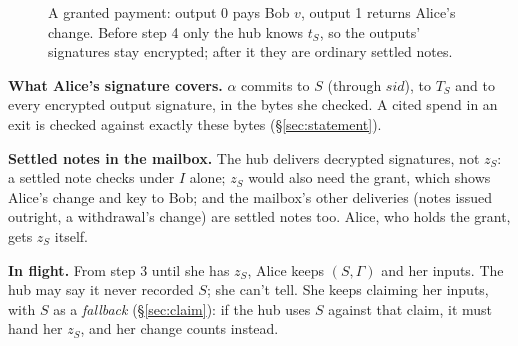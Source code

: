 \documentclass[11pt]{article}
\theoremstyle{plain}
\theoremstyle{definition}
\newcommand{\sid}{\mathit{sid}}
\newcommand{\BVfy}{\mathsf{BVerify}}
\newcommand{\Dec}{\mathsf{Decrypt}}
\begin{document}
\begin{figure}[!tbp]
\caption{A granted payment: output 0 pays Bob $v$, output 1 returns
Alice's change. Before step 4 only the hub knows $t_S$, so the outputs'
signatures stay encrypted; after it they are ordinary settled notes.}
\label{fig:payment}
\end{figure}

\textbf{What Alice's signature covers.} $\alpha$ commits to $S$ (through
$\sid$), to $T_S$ and to every encrypted output signature, in the bytes
she checked. A cited spend in an exit is checked against exactly these
bytes (\S\ref{sec:statement}).

\textbf{Settled notes in the mailbox.} The hub delivers decrypted
signatures, not $z_S$: a settled note checks under $I$ alone; $z_S$
would also need the grant, which shows Alice's change and key to Bob;
and the mailbox's other deliveries (notes issued outright, a
withdrawal's change) are settled notes too. Alice, who holds the grant,
gets $z_S$ itself.

\textbf{In flight.} From step 3 until she has $z_S$, Alice keeps $(S,
\Gamma)$ and her inputs. The hub may say it never recorded $S$; she
can't tell. She keeps claiming her inputs, with $S$ as a
\emph{fallback} (\S\ref{sec:claim}): if the hub uses $S$ against that
claim, it must hand her $z_S$, and her change counts instead.
\end{document}
